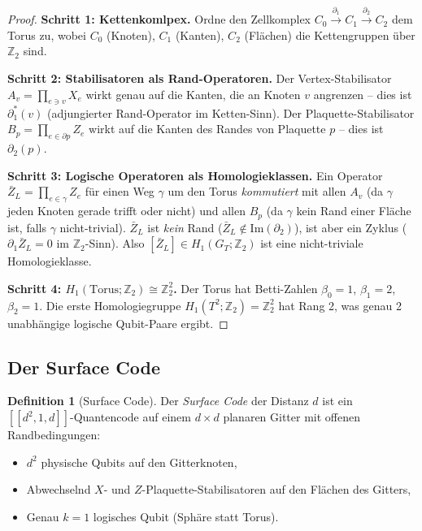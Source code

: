 ﻿\documentclass[a4paper,12pt]{article}
\theoremstyle{definition}
\newtheorem{definition}{Definition}
\begin{document}
\begin{proof}
\textbf{Schritt 1: Kettenkomlpex.}
Ordne den Zellkomplex $C_0 \xrightarrow{\partial_1} C_1 \xrightarrow{\partial_2} C_2$
dem Torus zu, wobei $C_0$ (Knoten), $C_1$ (Kanten), $C_2$ (Fl\"achen) die
Kettengruppen \"uber $\mathbb{Z}_2$ sind.

\textbf{Schritt 2: Stabilisatoren als Rand-Operatoren.}
Der Vertex-Stabilisator $A_v = \prod_{e \ni v} X_e$ wirkt genau auf die
Kanten, die an Knoten $v$ angrenzen -- dies ist $\partial_1^*(v)$
(adjungierter Rand-Operator im Ketten-Sinn).
Der Plaquette-Stabilisator $B_p = \prod_{e \in \partial p} Z_e$ wirkt
auf die Kanten des Randes von Plaquette $p$ -- dies ist $\partial_2(p)$.

\textbf{Schritt 3: Logische Operatoren als Homologieklassen.}
Ein Operator $\bar{Z}_L = \prod_{e \in \gamma} Z_e$ f\"ur einen
Weg $\gamma$ um den Torus \emph{kommutiert} mit allen $A_v$
(da $\gamma$ jeden Knoten gerade trifft oder nicht) und allen $B_p$
(da $\gamma$ kein Rand einer Fl\"ache ist, falls $\gamma$ nicht-trivial).
$\bar{Z}_L$ ist \emph{kein} Rand ($\bar{Z}_L \notin \mathrm{Im}(\partial_2)$),
ist aber ein Zyklus ($\partial_1 \bar{Z}_L = 0$ im $\mathbb{Z}_2$-Sinn).
Also $[\bar{Z}_L] \in H_1(G_T; \mathbb{Z}_2)$ ist eine nicht-triviale
Homologieklasse.

\textbf{Schritt 4: $H_1(\text{Torus}; \mathbb{Z}_2) \cong \mathbb{Z}_2^2$.}
Der Torus hat Betti-Zahlen $\beta_0 = 1$, $\beta_1 = 2$, $\beta_2 = 1$.
Die erste Homologiegruppe $H_1(T^2; \mathbb{Z}_2) = \mathbb{Z}_2^2$ hat
Rang 2, was genau 2 unabh\"angige logische Qubit-Paare ergibt.
\end{proof}

\subsection{Der Surface Code}

\begin{definition}[Surface Code]
\label{def:surface}
Der \emph{Surface Code} der Distanz $d$ ist ein $[[d^2, 1, d]]$-Quantencode
auf einem $d \times d$ planaren Gitter mit offenen Randbedingungen:
\begin{itemize}
    \item $d^2$ physische Qubits auf den Gitterknoten,
    \item Abwechselnd $X$- und $Z$-Plaquette-Stabilisatoren
          auf den Fl\"achen des Gitters,
    \item Genau $k = 1$ logisches Qubit (Sph\"are statt Torus).
\end{itemize}
\end{definition}
\end{document}
